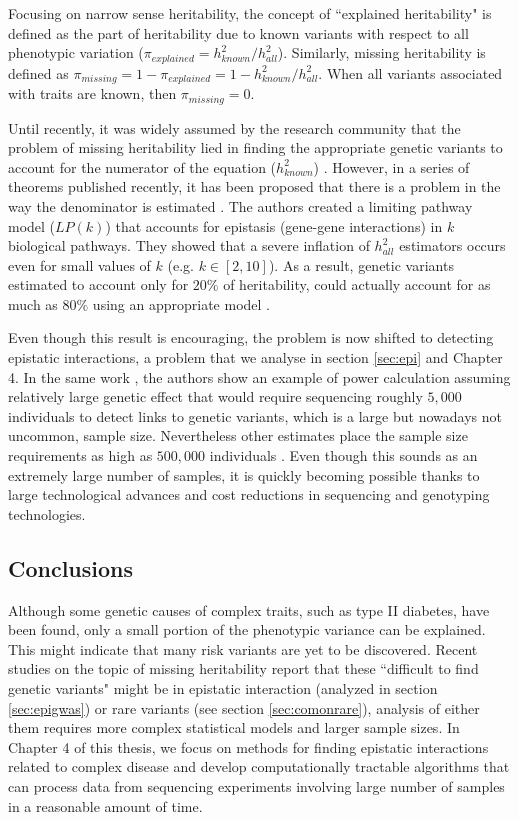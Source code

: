 Focusing on narrow sense heritability, the concept of ``explained heritability" is defined as the part of heritability due to known variants with respect to all phenotypic variation ($\pi_{explained} = h^2_{known} / h^2_{all}$). Similarly, missing heritability is defined as $\pi_{missing} = 1 - \pi_{explained} = 1 - h^2_{known} / h^2_{all}$. When all variants associated with traits are known, then $\pi_{missing} = 0$.

Until recently, it was widely assumed by the research community that the problem of missing heritability lied in finding the appropriate genetic variants to account for the numerator of the equation ($h^2_{known}$) \cite{zuk2012mystery}. However, in a series of theorems published recently, it has been proposed that there is a problem in the way the denominator is estimated \cite{zuk2012mystery}. The authors created a limiting pathway model ($LP(k)$) that accounts for epistasis (gene-gene interactions) in $k$ biological pathways. They showed that a severe inflation of $h^2_{all}$ estimators occurs even for small values of $k$ (e.g. $k \in [2,10]$). As a result, genetic variants estimated to account only for $20\%$ of heritability, could actually account for as much as $80\%$ using an appropriate model \cite{zuk2012mystery}.

Even though this result is encouraging, the problem is now shifted to detecting epistatic interactions, a problem that we analyse in section \ref{sec:epi} and Chapter 4. In the same work \cite{zuk2012mystery}, the authors show an example of power calculation assuming relatively large genetic effect that would require sequencing roughly $5,000$ individuals to detect links to genetic variants, which is a large but nowadays not uncommon, sample size. Nevertheless other estimates place the sample size requirements as high as  $500,000$ individuals \cite{zuk2012mystery}. Even though this sounds as an extremely large number of samples, it is quickly becoming possible thanks to large technological advances and cost reductions in sequencing and genotyping technologies.

\subsection{Conclusions}

Although some genetic causes of complex traits, such as type II diabetes, have been found, only a small portion of the phenotypic variance can be explained. This might indicate that many risk variants are yet to be discovered. Recent studies on the topic of missing heritability report that these ``difficult to find genetic variants" might be in epistatic interaction (analyzed in section \ref{sec:epigwas}) or rare variants (see section \ref{sec:comonrare}), analysis of either them requires more complex statistical models and larger sample sizes. In Chapter 4 of this thesis, we focus on methods for finding epistatic interactions related to complex disease and develop computationally tractable algorithms that can process data from sequencing experiments involving large number of samples in a reasonable amount of time.

